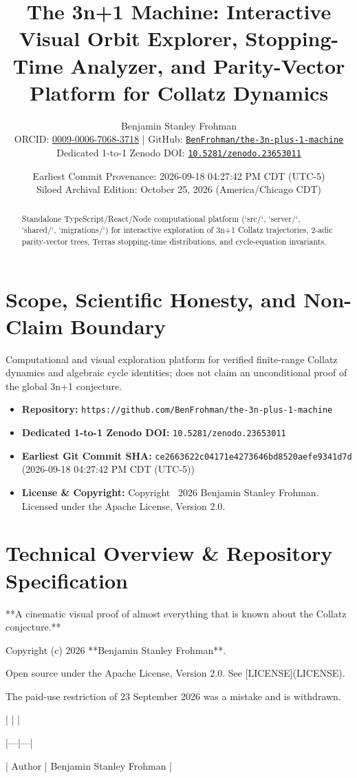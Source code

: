 \documentclass[11pt,a4paper]{article}
\title{\textbf{The 3n+1 Machine: Interactive Visual Orbit Explorer, Stopping-Time Analyzer, and Parity-Vector Platform for Collatz Dynamics}}
\author{Benjamin Stanley Frohman\\
\small ORCID: \href{https://orcid.org/0009-0006-7068-3718}{0009-0006-7068-3718} \quad|\quad
GitHub: \href{https://github.com/BenFrohman/the-3n-plus-1-machine}{\texttt{BenFrohman/the-3n-plus-1-machine}}\\
\small Dedicated 1-to-1 Zenodo DOI: \href{https://doi.org/10.5281/zenodo.23653011}{\texttt{10.5281/zenodo.23653011}}}
\date{Earliest Commit Provenance: 2026-09-18 04:27:42 PM CDT (UTC-5)\\
Siloed Archival Edition: October 25, 2026 (America/Chicago CDT)}
\begin{document}
\maketitle

\begin{abstract}
Standalone TypeScript/React/Node computational platform (`src/`, `server/`, `shared/`, `migrations/`) for interactive exploration of 3n+1 Collatz trajectories, 2-adic parity-vector trees, Terras stopping-time distributions, and cycle-equation invariants.
\end{abstract}

\section{Scope, Scientific Honesty, and Non-Claim Boundary}
Computational and visual exploration platform for verified finite-range Collatz dynamics and algebraic cycle identities; does not claim an unconditional proof of the global 3n+1 conjecture.

\begin{itemize}
  \item \textbf{Repository:} \texttt{https://github.com/BenFrohman/the-3n-plus-1-machine}
  \item \textbf{Dedicated 1-to-1 Zenodo DOI:} \texttt{10.5281/zenodo.23653011}
  \item \textbf{Earliest Git Commit SHA:} \texttt{ce2663622c04171e4273646bd8520aefe9341d7d} (2026-09-18 04:27:42 PM CDT (UTC-5))
  \item \textbf{License \& Copyright:} Copyright \textcopyright\ 2026 Benjamin Stanley Frohman. Licensed under the Apache License, Version 2.0.
\end{itemize}

\section{Technical Overview \& Repository Specification}
**A cinematic visual proof of almost everything that is known about the Collatz conjecture.**

Copyright (c) 2026 **Benjamin Stanley Frohman**.

Open source under the Apache License, Version 2.0. See [LICENSE](LICENSE).

The paid-use restriction of 23 September 2026 was a mistake and is withdrawn.

| | |

|---|---|

| Author | Benjamin Stanley Frohman |
\end{document}
